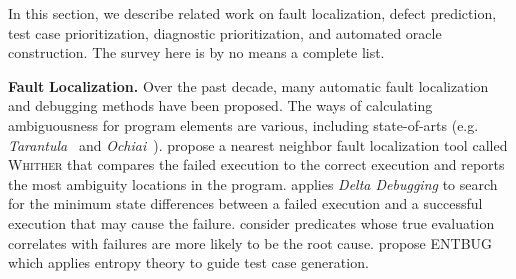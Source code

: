 In this section, we describe related work on fault localization, defect prediction, test case prioritization,  diagnostic prioritization, and automated oracle construction. The survey here is by no means a complete list.



\smallskip\noindent
\textbf{Fault} \textbf{Localization.} Over the past decade, many automatic fault localization and debugging methods have been proposed.
The ways of calculating ambiguousness  for program elements are various, including state-of-arts (e.g. {\em Tarantula}~\citep{JHS02,JH05} and {\em Ochiai}~\citep{Abreu:2009.jss}).
\cite{RR03} propose a nearest neighbor fault localization tool called \textsc{Whither} that compares the failed execution
to the correct execution and reports the most ambiguity  locations in the program.
\cite{Zeller2002a} applies {\em Delta Debugging} to search for the minimum state differences between a failed execution and a successful execution that may cause the failure. \cite{LAZJ03} consider predicates whose true evaluation correlates with failures are more likely to be the root cause. 
\cite{campos2013entropy} propose ENTBUG which applies entropy theory to guide test case generation.



